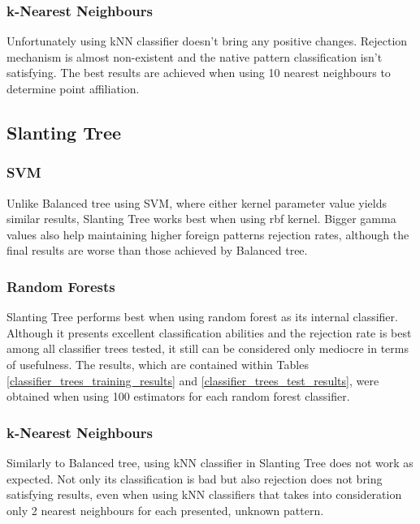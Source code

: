 \subsubsection{k-Nearest Neighbours}

Unfortunately using kNN classifier doesn't bring any positive changes. Rejection mechanism is almost non-existent and the native pattern classification isn't satisfying. The best results are achieved when using 10 nearest neighbours to determine point affiliation.

\subsection{Slanting Tree}

\subsubsection{SVM}

Unlike Balanced tree using SVM, where either kernel parameter value yields similar results, Slanting Tree works best when using rbf kernel. Bigger gamma values also help maintaining higher foreign patterns rejection rates, although the final results are worse than those achieved by Balanced tree.

\subsubsection{Random Forests}

Slanting Tree performs best when using random forest as its internal classifier. Although it presents excellent classification abilities and the rejection rate is best among all classifier trees tested, it still can be considered only mediocre in terms of usefulness. The results, which are contained within Tables \ref{classifier_trees_training_results} and \ref{classifier_trees_test_results}, were obtained when using 100 estimators for each random forest classifier.

\subsubsection{k-Nearest Neighbours}

Similarly to Balanced tree, using kNN classifier in Slanting Tree does not work as expected. Not only its classification is bad but also rejection does not bring satisfying results, even when using kNN classifiers that takes into consideration only 2 nearest neighbours for each presented, unknown pattern.


